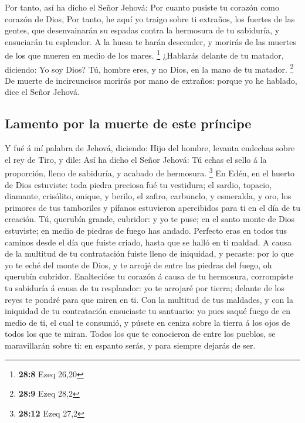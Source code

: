  Por tanto, así ha dicho el Señor Jehová: Por cuanto
pusiste tu corazón como corazón de Dios,  Por tanto, he
aquí yo traigo sobre ti extraños, los fuertes de las gentes, que
desenvainarán su espadas contra la hermosura de tu sabiduría, y
ensuciarán tu esplendor.  A la huesa te harán descender, y
morirás de las muertes de los que mueren en medio de los mares.
\footnote{\textbf{28:8} Ezeq 26,20}  ¿Hablarás delante de
tu matador, diciendo: Yo soy Dios? Tú, hombre eres, y no Dios, en la
mano de tu matador. \footnote{\textbf{28:9} Ezeq 28,2} 
De muerte de incircuncisos morirás por mano de extraños: porque yo he
hablado, dice el Señor Jehová.

\hypertarget{lamento-por-la-muerte-de-este-pruxedncipe}{%
\subsection{Lamento por la muerte de este
príncipe}\label{lamento-por-la-muerte-de-este-pruxedncipe}}

 Y fué á mí palabra de Jehová, diciendo: 
Hijo del hombre, levanta endechas sobre el rey de Tiro, y dile: Así ha
dicho el Señor Jehová: Tú echas el sello á la proporción, lleno de
sabiduría, y acabado de hermosura. \footnote{\textbf{28:12} Ezeq 27,2}
 En Edén, en el huerto de Dios estuviste: toda piedra
preciosa fué tu vestidura; el sardio, topacio, diamante, crisólito,
onique, y berilo, el zafiro, carbunclo, y esmeralda, y oro, los primores
de tus tamboriles y pífanos estuvieron apercibidos para ti en el día de
tu creación.  Tú, querubín grande, cubridor: y yo te
puse; en el santo monte de Dios estuviste; en medio de piedras de fuego
has andado.  Perfecto eras en todos tus caminos desde el
día que fuiste criado, hasta que se halló en ti maldad. 
A causa de la multitud de tu contratación fuiste lleno de iniquidad, y
pecaste: por lo que yo te eché del monte de Dios, y te arrojé de entre
las piedras del fuego, oh querubín cubridor.  Enaltecióse
tu corazón á causa de tu hermosura, corrompiste tu sabiduría á causa de
tu resplandor: yo te arrojaré por tierra; delante de los reyes te pondré
para que miren en ti.  Con la multitud de tus maldades, y
con la iniquidad de tu contratación ensuciaste tu santuario: yo pues
saqué fuego de en medio de ti, el cual te consumió, y púsete en ceniza
sobre la tierra á los ojos de todos los que te miran. 
Todos los que te conocieron de entre los pueblos, se maravillarán sobre
ti: en espanto serás, y para siempre dejarás de ser.

